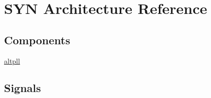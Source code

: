 \hypertarget{classpll_1_1_s_y_n}{}\section{S\+Y\+N Architecture Reference}
\label{classpll_1_1_s_y_n}
\subsection*{Components}
 \begin{DoxyCompactItemize}
\item 
\hyperlink{classpll_1_1_s_y_n_ad45c11bbc2e898d68e19fa2eb5ba73d5}{altpll}  {\bfseries }  
\end{DoxyCompactItemize}
\subsection*{Signals}
